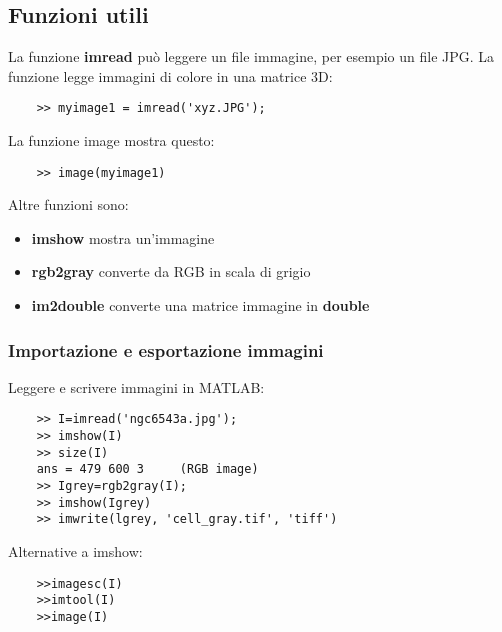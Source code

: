 \documentclass[a4paper, 10pt]{article}
\begin{document}
\subsection{Funzioni utili}
La funzione \textbf{imread} può leggere un file immagine, per esempio un file JPG. La funzione legge immagini di colore in una matrice 3D:
\begin{lstlisting}
	>> myimage1 = imread('xyz.JPG');
\end{lstlisting}
La funzione image mostra questo:
\begin{lstlisting}
	>> image(myimage1)
\end{lstlisting}
Altre funzioni sono:
\begin{itemize}
\item \textbf{imshow} mostra un'immagine
\item \textbf{rgb2gray} converte da RGB in scala di grigio
\item \textbf{im2double} converte una matrice immagine in \textbf{double}
\end{itemize}

\subsubsection{Importazione e esportazione immagini}
Leggere e scrivere immagini in MATLAB:
\begin{lstlisting}
	>> I=imread('ngc6543a.jpg');
	>> imshow(I)
	>> size(I)
	ans = 479 600 3		(RGB image)
	>> Igrey=rgb2gray(I);
	>> imshow(Igrey)
	>> imwrite(lgrey, 'cell_gray.tif', 'tiff')
\end{lstlisting}
Alternative a imshow:
\begin{lstlisting}
	>>imagesc(I)
	>>imtool(I)
	>>image(I)
\end{lstlisting}
\end{document}
